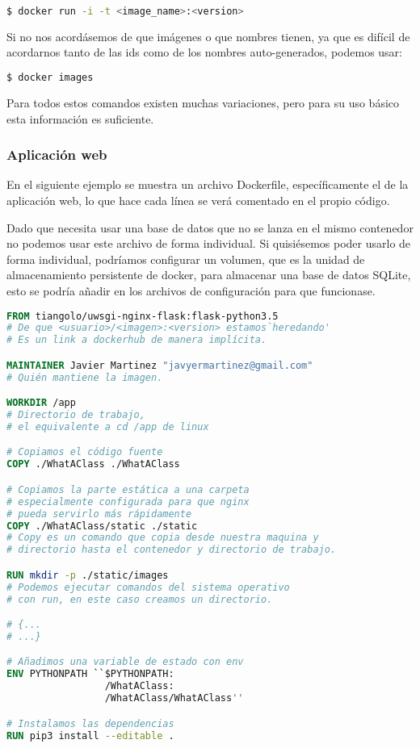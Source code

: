 \lstset{style=linestyle}
\begin{lstlisting}[language=bash]
    $ docker run -i -t <image_name>:<version>
\end{lstlisting}

Si no nos acordásemos de que imágenes o que nombres tienen, ya que es difícil de acordarnos tanto de las ids como de los nombres auto-generados, podemos usar:

\lstset{style=linestyle}
\begin{lstlisting}[language=bash]
    $ docker images
\end{lstlisting}

Para todos estos comandos existen muchas variaciones, pero para su uso básico esta información es suficiente.


\subsubsection{Aplicación web}

En el siguiente ejemplo se muestra un archivo Dockerfile, específicamente el de la aplicación web, lo que hace cada línea se verá comentado en el propio código. 

Dado que necesita usar una base de datos que no se lanza en el mismo contenedor no podemos usar este archivo de forma individual. Si quisiésemos poder usarlo de forma individual, podríamos configurar un volumen, que es la unidad de almacenamiento persistente de docker, para almacenar una base de datos SQLite, esto se podría añadir en los archivos de configuración para que funcionase.


\lstset{style=blockstyle}
\begin{lstlisting}[language=dockerfile]
FROM tiangolo/uwsgi-nginx-flask:flask-python3.5
# De que <usuario>/<imagen>:<version> estamos`heredando'
# Es un link a dockerhub de manera implícita.

MAINTAINER Javier Martinez "javyermartinez@gmail.com"
# Quién mantiene la imagen.

WORKDIR /app
# Directorio de trabajo, 
# el equivalente a cd /app de linux

# Copiamos el código fuente 
COPY ./WhatAClass ./WhatAClass

# Copiamos la parte estática a una carpeta 
# especialmente configurada para que nginx 
# pueda servirlo más rápidamente
COPY ./WhatAClass/static ./static
# Copy es un comando que copia desde nuestra maquina y 
# directorio hasta el contenedor y directorio de trabajo.

RUN mkdir -p ./static/images
# Podemos ejecutar comandos del sistema operativo 
# con run, en este caso creamos un directorio.

# {...
# ...}

# Añadimos una variable de estado con env
ENV PYTHONPATH ``$PYTHONPATH:
                 /WhatAClass:
                 /WhatAClass/WhatAClass''

# Instalamos las dependencias
RUN pip3 install --editable .
\end{lstlisting}


